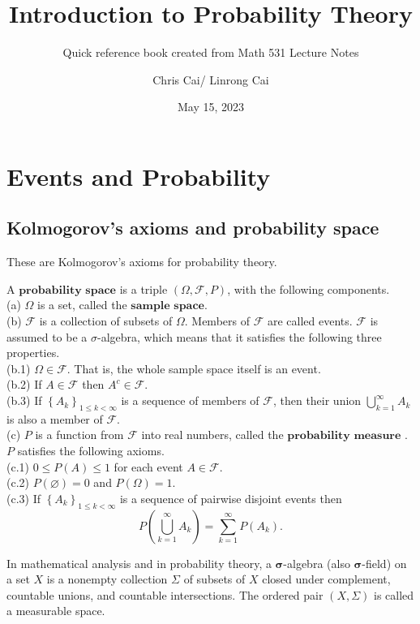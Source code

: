 \documentclass[11pt]{elegantbook}
\title{Introduction to Probability Theory}
\subtitle{Quick reference book created from Math 531 Lecture Notes}
\author{Chris Cai/ Linrong Cai}
\institute{University of Wisconisn Madison}
\date{May 15, 2023}
\begin{document}
\maketitle

\frontmatter
\tableofcontents

\mainmatter

\chapter{Events and Probability}

\section{Kolmogorov's axioms and probability space}

These are Kolmogorov's axioms for probability theory.
\begin{definition}
A $\textbf{probability space}$ is a triple $(\Omega, \mathcal{F}, P)$, with the following components. \\
(a) $\Omega$ is a set, called the $\textbf{sample space}$. \\ 
(b) $\mathcal{F}$ is a collection of subsets of $\Omega$. Members of $\mathcal{F}$ are called events. $\mathcal{F}$ is assumed to be a $\sigma$-algebra, which means that it satisfies the following three properties.\\
(b.1) $\Omega \in \mathcal{F}$. That is, the whole sample space itself is an event.\\
(b.2) If $A \in \mathcal{F}$ then $A^c \in \mathcal{F}$.\\
(b.3) If $\left\{A_k\right\}_{1 \leq k<\infty}$ is a sequence of members of $\mathcal{F}$, then their union $\bigcup_{k=1}^{\infty} A_k$ is also a member of $\mathcal{F}$.\\
(c) $P$ is a function from $\mathcal{F}$ into real numbers, called the $\textbf{probability measure}$ . $P$ satisfies the following axioms.\\
(c.1) $0 \leq P(A) \leq 1$ for each event $A \in \mathcal{F}$.\\
(c.2) $P(\varnothing)=0$ and $P(\Omega)=1$.\\
(c.3) If $\left\{A_k\right\}_{1 \leq k<\infty}$ is a sequence of pairwise disjoint events then
$$
P\left(\bigcup_{k=1}^{\infty} A_k\right)=\sum_{k=1}^{\infty} P\left(A_k\right) .
$$
\end{definition}

\begin{note}
    In mathematical analysis and in probability theory, a $\boldsymbol{\sigma}$-algebra (also $\boldsymbol{\sigma}$-field) on a set $X$ is a nonempty collection $\Sigma$ of subsets of $X$ closed under complement, countable unions, and countable intersections. The ordered pair $(X, \Sigma)$ is called a measurable space.
\end{note}
\end{document}
